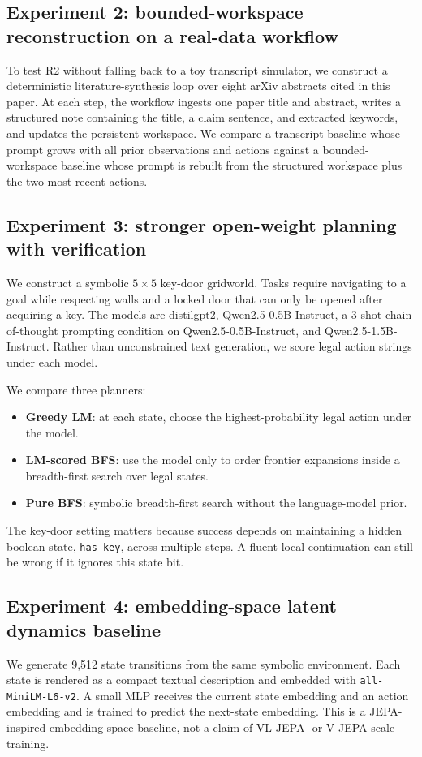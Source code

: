 \documentclass[11pt]{article}
\begin{document}
\subsection{Experiment 2: bounded-workspace reconstruction on a real-data workflow}
To test R2 without falling back to a toy transcript simulator, we construct a deterministic literature-synthesis loop over eight arXiv abstracts cited in this paper. At each step, the workflow ingests one paper title and abstract, writes a structured note containing the title, a claim sentence, and extracted keywords, and updates the persistent workspace. We compare a transcript baseline whose prompt grows with all prior observations and actions against a bounded-workspace baseline whose prompt is rebuilt from the structured workspace plus the two most recent actions.

\subsection{Experiment 3: stronger open-weight planning with verification}
We construct a symbolic $5\times5$ key-door gridworld. Tasks require navigating to a goal while respecting walls and a locked door that can only be opened after acquiring a key. The models are distilgpt2, Qwen2.5-0.5B-Instruct, a 3-shot chain-of-thought prompting condition on Qwen2.5-0.5B-Instruct, and Qwen2.5-1.5B-Instruct. Rather than unconstrained text generation, we score legal action strings under each model.

We compare three planners:
\begin{itemize}
    \item \textbf{Greedy LM}: at each state, choose the highest-probability legal action under the model.
    \item \textbf{LM-scored BFS}: use the model only to order frontier expansions inside a breadth-first search over legal states.
    \item \textbf{Pure BFS}: symbolic breadth-first search without the language-model prior.
\end{itemize}
The key-door setting matters because success depends on maintaining a hidden boolean state, \texttt{has\_key}, across multiple steps. A fluent local continuation can still be wrong if it ignores this state bit.

\subsection{Experiment 4: embedding-space latent dynamics baseline}
We generate 9,512 state transitions from the same symbolic environment. Each state is rendered as a compact textual description and embedded with \texttt{all-MiniLM-L6-v2}. A small MLP receives the current state embedding and an action embedding and is trained to predict the next-state embedding. This is a JEPA-inspired embedding-space baseline, not a claim of VL-JEPA- or V-JEPA-scale training.
\end{document}
